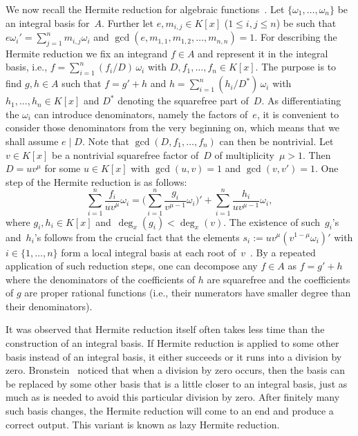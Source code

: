 \documentclass{sig-alternate}
\begin{document}
We now recall the Hermite reduction for algebraic functions~\cite{trager84,ACA1992,bronstein98}.
Let $\{\omega_1,\ldots,\omega_n\}$ be an integral basis for~$A$.
Further let $e, m_{i,j}\in K[x]$ ($1\leq i,j\leq n$) be such that
$e\omega_i'=\sum_{j=1}^n m_{i,j}\omega_i$ and
$\gcd(e,m_{1,1},m_{1,2},\ldots,m_{n,n})=1$.
For describing the Hermite reduction we fix an integrand $f\in A$ and represent it in the
integral basis, i.e., $f=\sum_{i=1}^n (f_i/D)\,\omega_i$ with
$D, f_1,\ldots,f_n\in K[x]$. The purpose is to find $g, h\in A$ such that
$f=g' + h$ and $h=\sum_{i=1}^n(h_i/D^\ast)\,\omega_i$ with $h_1,\ldots,h_n\in K[x]$
and $D^\ast$ denoting the squarefree part of~$D$.
As differentiating the $\omega_i$ can introduce
denominators, name\-ly the factors of~$e$, it is convenient to consider those
denominators from the very beginning on, which means that we shall assume
$e\mid D$. Note that $\gcd(D,f_1,\ldots,f_n)$ can then be nontrivial.
Let~$v\in K[x]$ be a nontrivial squarefree factor of~$D$ of multiplicity~$\mu>1$.
Then~$D = uv^\mu$ for some $u\in K[x]$ with $\gcd(u, v)=1$ and $\gcd(v,v')=1$.
One step of the Hermite reduction is as follows:
\begin{equation}\label{eq:hred}
  \sum_{i=1}^n \frac{f_i}{uv^\mu}\omega_i =
  \biggl(\sum_{i=1}^n\frac{g_i}{v^{\mu-1}}\omega_i\biggr)' +
  \sum_{i=1}^n \frac{h_i}{uv^{\mu-1}}\omega_i,
\end{equation}
where $g_i, h_i \in K[x]$ and~$\deg_x(g_i)< \deg_x(v)$.
The existence of such~$g_i$'s and~$h_i$'s follows from the crucial fact that
the elements $s_i :=  uv^\mu(v^{1-\mu}\omega_i)'$ with $i\in \{ 1, \ldots, n\}$
form a local integral basis at each root of~$v$~\cite[page 46]{trager84}.
By a repeated application of such reduction steps, one can decompose any $f\in A$
as $f=g' + h$ where the denominators of the coefficients of $h$ are squarefree
and the coefficients of $g$ are proper rational functions (i.e., their numerators
have smaller degree than their denominators).

It was observed that Hermite reduction itself often takes less time than the construction
of an integral basis. If Hermite reduction is applied to some other basis instead
of an integral basis, it either succeeds or it runs into a division by zero.
Bronstein~\cite{bronstein98a} noticed that when a division by zero occurs, then the basis can
be replaced by some other basis that is a little closer to an integral basis, just
as much as is needed to avoid this particular division by zero. After finitely many
such basis changes, the Hermite reduction will come to an end and produce a correct
output. This variant is known as lazy Hermite reduction.
\end{document}
